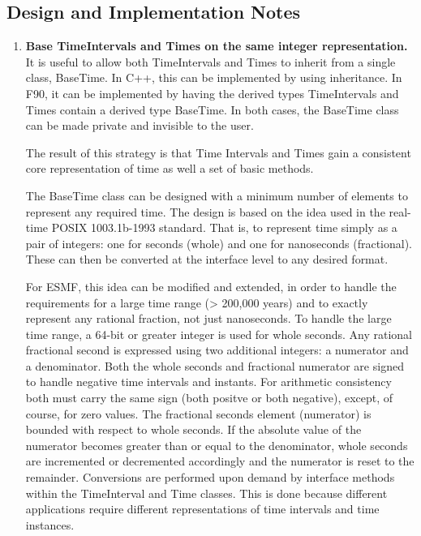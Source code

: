 
\subsection{Design and Implementation Notes}
\begin{enumerate}

\item {\bf Base TimeIntervals and Times on the same integer representation.} 
It is useful to allow both TimeIntervals and Times to 
inherit from a single class, BaseTime.  In C++, this can be
implemented by using inheritance.  In F90, it can be implemented
by having the derived types TimeIntervals and Times
contain a derived type BaseTime.  In both cases, the 
BaseTime class can be made private and invisible to the user.

The result of this strategy is that Time Intervals and 
Times gain a consistent core representation of time as well a set
of basic methods.

The BaseTime class can be designed with a minimum number of elements
to represent any required time.  The design is based on the idea used
in the real-time POSIX 1003.1b-1993 standard.  That is, to represent
time simply as a pair of integers: one for seconds (whole) and one for
nanoseconds (fractional).  These can then be converted at the interface
level to any desired format.

For ESMF, this idea can be modified and extended, in order to handle the
requirements for a large time range (> 200,000 years) and to exactly
represent any rational fraction, not just nanoseconds.  To handle the
large time range, a 64-bit or greater integer is used for whole seconds.
Any rational fractional second is expressed using two additional integers:
a numerator and a denominator.  Both the whole seconds and fractional
numerator are signed to handle negative time intervals and instants.
For arithmetic consistency both must carry the same sign (both positve
or both negative), except, of course, for zero values.  The fractional
seconds element (numerator) is bounded with respect to whole seconds. 
If the absolute value of the
numerator becomes greater than or equal to the denominator, whole
seconds are incremented or decremented accordingly and the numerator is
reset to the remainder.  Conversions are performed upon demand by
interface methods within the TimeInterval and
Time classes.  This is done because different applications require different
representations of time intervals and time instances.


\end{enumerate}
